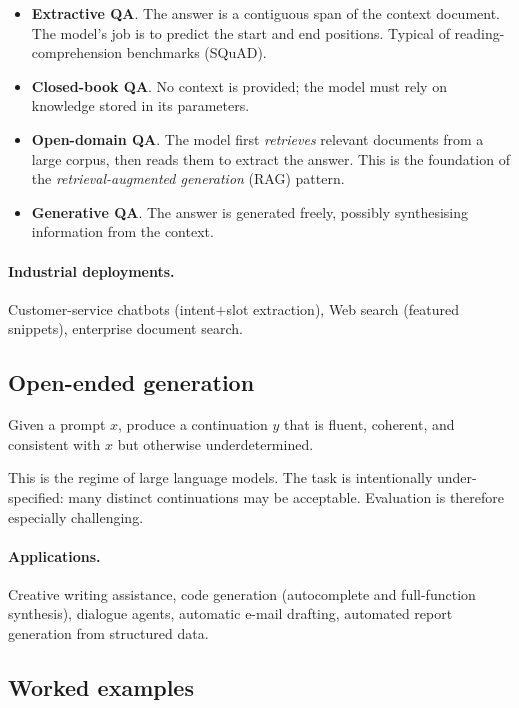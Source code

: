 \begin{itemize}
    \item \textbf{Extractive QA}. The answer is a contiguous span of the context document. The model's job is to predict the start and end positions. Typical of reading-comprehension benchmarks (SQuAD).
    \item \textbf{Closed-book QA}. No context is provided; the model must rely on knowledge stored in its parameters.
    \item \textbf{Open-domain QA}. The model first \emph{retrieves} relevant documents from a large corpus, then reads them to extract the answer. This is the foundation of the \emph{retrieval-augmented generation} (RAG) pattern.
    \item \textbf{Generative QA}. The answer is generated freely, possibly synthesising information from the context.
\end{itemize}

\paragraph{Industrial deployments.} Customer-service chatbots (intent$+$slot extraction), Web search (featured snippets), enterprise document search.

\subsection{Open-ended generation}

\begin{definition}
Given a prompt $x$, produce a continuation $y$ that is fluent, coherent, and consistent with $x$ but otherwise underdetermined.
\end{definition}

This is the regime of large language models. The task is intentionally under-specified: many distinct continuations may be acceptable. Evaluation is therefore especially challenging.

\paragraph{Applications.} Creative writing assistance, code generation (autocomplete and full-function synthesis), dialogue agents, automatic e-mail drafting, automated report generation from structured data.

\subsection{Worked examples}

